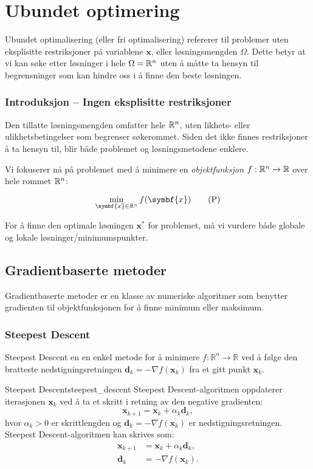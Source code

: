 \part{Ubundet optimering}
\label{part:unconstrained_optimization}

Ubundet optimalisering (eller fri optimalisering) refererer til problemer uten eksplisitte restriksjoner på variablene \(\symbf{x}\), eller løsningsmengden \(\Omega\).
Dette betyr at vi kan søke etter løsninger i hele \(\Omega = \mathbb{R}^n\) uten å måtte ta hensyn til begrensninger som kan hindre oss i å finne den beste løsningen.

\section{Introduksjon -- Ingen eksplisitte restriksjoner}
Den tillatte løsningsmengden omfatter hele \(\mathbb{R}^n\), uten likhets- eller ulikhetsbetingelser som begrenser søkerommet.
Siden det ikke finnes restriksjoner å ta hensyn til, blir både problemet og løsningsmetodene enklere.

Vi fokuserer nå på problemet med å minimere en \textit{objektfunksjon} \( f : \mathbb{R}^n \to \mathbb{R} \) over hele rommet \(\mathbb{R}^n\):

\[
	\min_{\symbf{x} \in \R^n} f(\symbf{x}) \tag{P} \label{eq:global_minimization_problem}
\]

For å finne den optimale løsningen \(\symbf{x}^\ast\) for problemet, må vi vurdere både globale og lokale løsninger/minimumspunkter.

\chapter{Gradientbaserte metoder}
\label{chap:gradient_based_methods}
Gradientbaserte metoder er en klasse av numeriske algoritmer som benytter gradienten til objektfunksjonen for å finne minimum eller maksimum.
\section{Steepest Descent}
\label{sec:steepest_descent}
Steepest Descent en en enkel metode for å minimere \(f: \mathbb{R}^n \to \mathbb{R}\) ved å følge den bratteste nedstigningsretningen \( \symbf{d}_k = -\nabla f(\symbf{x}_k)\) fra et gitt punkt \( \symbf{x}_k \).
\begin{definition}{Steepest Descent}{steepest_descent}
	Steepest Descent-algoritmen oppdaterer iterasjonen \( \symbf{x}_k \) ved å ta et skritt i retning av den negative gradienten:
	\[
		\symbf{x}_{k+1} = \symbf{x}_k + \alpha_k \symbf{d}_k,
	\]
	hvor \( \alpha_k > 0 \) er skrittlengden og \( \symbf{d}_k = -\nabla f(\symbf{x}_k) \) er nedstigningsretningen.
	\medskip
	Steepest Descent-algoritmen kan skrives som:
	\begin{align*}
		\symbf{x}_{k+1} & = \symbf{x}_k + \alpha_k \symbf{d}_k, \\
		\symbf{d}_k     & = -\nabla f(\symbf{x}_k).
	\end{align*}

\end{definition}

